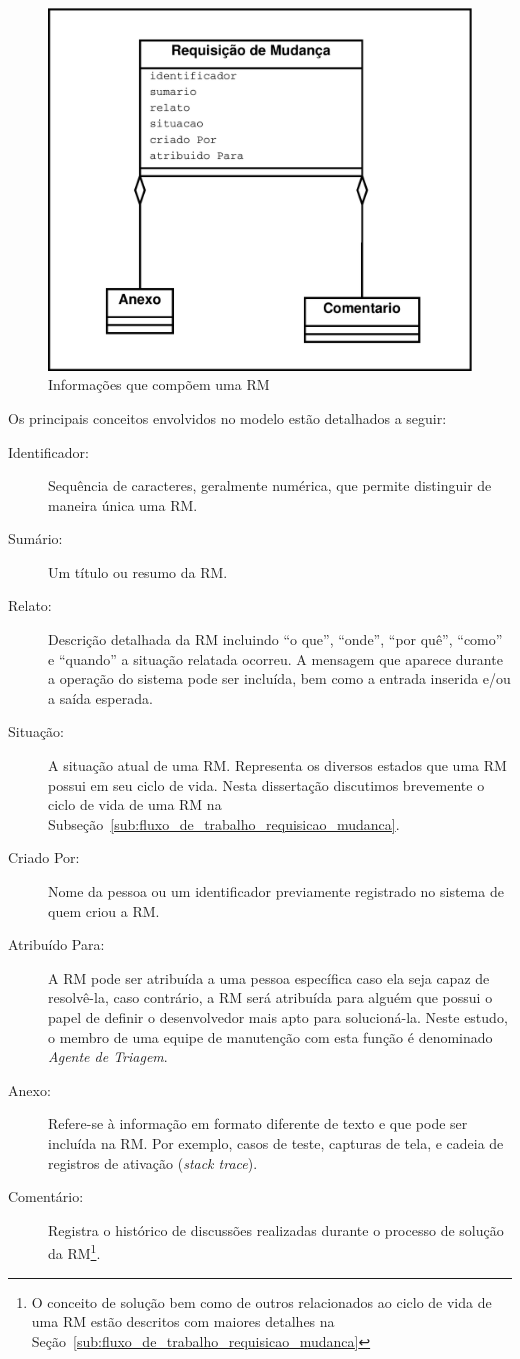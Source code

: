 \begin{figure}[htpb]
	\centering
	\includegraphics[width=0.5\linewidth]{./chapter-manutencao-software-visao-geral/img/diagrama-classe-atributos-requisicao-mudancas.pdf}
	\caption{Informações que compõem uma RM}\label{fig:diagrama-classe-atributos-requisicao-mudancas}
\end{figure}

Os principais conceitos envolvidos no modelo estão detalhados a seguir:

\begin{description}
    \item [Identificador:] Sequência de caracteres, geralmente numérica,  que
        permite distinguir de maneira única uma RM\@.
	\item [Sumário:] Um título ou resumo da RM\@.
    \item [Relato:] Descrição detalhada da RM incluindo ``o que'', ``onde'',
        ``por quê'', ``como'' e ``quando'' a situação relatada ocorreu. A
        mensagem que aparece durante a operação do sistema pode ser incluída,
        bem como a entrada inserida e/ou a saída esperada.
	\item [Situação:] A situação atual de uma RM\@. Representa os diversos
		estados que uma RM possui em seu ciclo de vida. Nesta dissertação
		discutimos brevemente o ciclo de vida de uma RM na
		Subseção~\ref{sub:fluxo_de_trabalho_requisicao_mudanca}.
    \item [Criado Por:] Nome da pessoa ou um identificador previamente registrado
        no sistema de quem criou a RM\@.
    \item [Atribuído Para:] A RM pode ser atribuída a uma pessoa específica
        caso ela seja capaz de resolvê-la, caso contrário, a RM será atribuída
        para alguém que possui o papel de definir o desenvolvedor mais apto
        para solucioná-la. Neste estudo, o membro de uma equipe de manutenção
        com esta função é denominado \textit{Agente de Triagem}.
    \item [Anexo:] Refere-se à informação em formato diferente de texto e que
        pode ser incluída na RM\@. Por exemplo, casos de teste, capturas de
        tela, e cadeia de registros de ativação (\textit{stack trace}).
    \item [Comentário:] Registra o histórico de discussões realizadas durante o
        processo de solução da RM\@\footnote{O conceito de solução bem como de
            outros relacionados ao ciclo de vida de uma RM estão descritos com
            maiores detalhes na
            Seção~\ref{sub:fluxo_de_trabalho_requisicao_mudanca}}.
\end{description}

